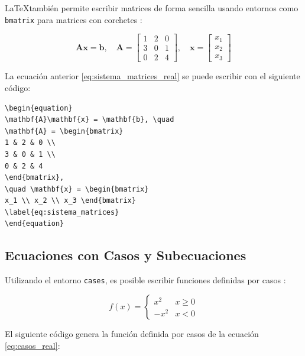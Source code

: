 \LaTeX también permite escribir matrices de forma sencilla usando entornos como \texttt{bmatrix} para matrices con corchetes \cite{amsmath_manual}:

\begin{equation}
\mathbf{A}\mathbf{x} = \mathbf{b}, \quad
\mathbf{A} = \begin{bmatrix}
1 & 2 & 0 \\
3 & 0 & 1 \\
0 & 2 & 4
\end{bmatrix},
\quad \mathbf{x} = \begin{bmatrix} x_1 \\ x_2 \\ x_3 \end{bmatrix}
\label{eq:sistema_matrices_real}
\end{equation}

La ecuación anterior \eqref{eq:sistema_matrices_real} se puede escribir con el siguiente código:

\begin{verbatim}
\begin{equation}
\mathbf{A}\mathbf{x} = \mathbf{b}, \quad
\mathbf{A} = \begin{bmatrix}
1 & 2 & 0 \\
3 & 0 & 1 \\
0 & 2 & 4
\end{bmatrix},
\quad \mathbf{x} = \begin{bmatrix} 
x_1 \\ x_2 \\ x_3 \end{bmatrix}
\label{eq:sistema_matrices}
\end{equation}
\end{verbatim}

\subsection{Ecuaciones con Casos y Subecuaciones}

Utilizando el entorno \texttt{cases}, es posible escribir funciones definidas por casos \cite{amsmath_manual}:

\begin{equation}
f(x) = \begin{cases}
x^2 & x \geq 0 \\
-x^2 & x < 0
\end{cases} \label{eq:casos_real}
\end{equation}

El siguiente código genera la función definida por casos de la ecuación \eqref{eq:casos_real}:

